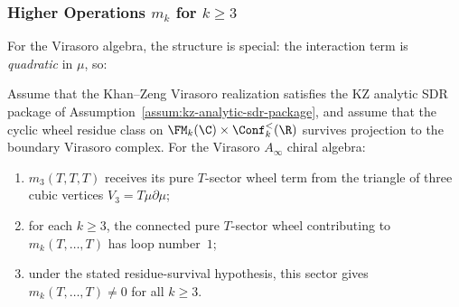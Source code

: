 \subsubsection{Higher Operations $m_k$ for $k \geq 3$}

For the Virasoro algebra, the structure is special: the interaction term is \emph{quadratic} in $\mu$, so:

\begin{proposition}
\label{prop:vir-truncation}
Assume that the Khan--Zeng Virasoro realization satisfies the KZ
analytic SDR package of
Assumption~\textup{\ref{assum:kz-analytic-sdr-package}}, and assume
that the cyclic wheel residue class on
$\FM_k(\C)\times\Conf_k^{<}(\R)$ survives projection to the boundary
Virasoro complex.
For the Virasoro $A_\infty$ chiral algebra:
\begin{enumerate}
\item $m_3(T, T, T)$ receives its pure $T$-sector wheel term from the
triangle of three cubic vertices $V_3=T\mu\partial\mu$;
\item for each $k \ge 3$, the connected pure $T$-sector wheel
contributing to $m_k(T,\ldots,T)$ has loop number~$1$;
\item under the stated residue-survival hypothesis, this sector gives
$m_k(T,\ldots,T)\ne0$ for all $k \ge 3$.
\end{enumerate}
\end{proposition}

